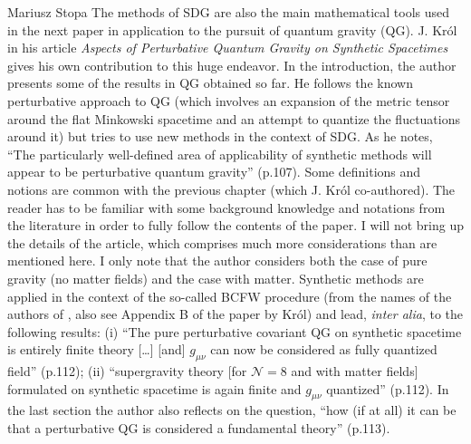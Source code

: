 \begin{recengenv}{Mariusz Stopa}
\enlargethispage{-.5\baselineskip}
The methods of SDG are also the main mathematical tools used in the next paper in application to the pursuit of quantum gravity (QG). J. Król in his article \textit{Aspects of Perturbative Quantum Gravity on Synthetic Spacetimes} gives his own contribution to this huge endeavor. In the introduction, the author presents some of the results in QG obtained so far. He follows the known perturbative approach to QG (which involves an expansion of the metric tensor around the flat Minkowski spacetime and an attempt to quantize the fluctuations around it) but tries to use new methods in the context of SDG. As he notes, ``The particularly well-defined area of applicability of synthetic methods will appear to be perturbative quantum gravity'' (p.107). Some definitions and notions are common with the previous chapter (which J. Król co-authored). The reader has to be familiar with some background knowledge and notations from the literature in order to fully follow the contents of the paper. I will not bring up the details of the article, which comprises much more considerations than are mentioned here. I only note that the author considers both the case of pure gravity (no matter fields) and the case with matter. Synthetic methods are applied in the context of the so-called BCFW procedure (from the names of the authors of \parencite{britto-2005}, also see Appendix B of the paper by Król) and lead, \textit{inter alia}, to the following results: (i) ``The pure perturbative covariant QG on synthetic spacetime is entirely finite theory [\ldots] [and] $ g_{\mu\nu} $ can now be considered as fully quantized field'' (p.112); (ii) ``supergravity theory [for $ \mathcal{N}=8 $ and with matter fields] formulated on synthetic spacetime is again finite and $ g_{\mu\nu} $ quantized'' (p.112). In the last section the author also reflects on the question, ``how (if at all) it can be that a perturbative QG is considered a fundamental theory'' (p.113).


\end{recengenv}
